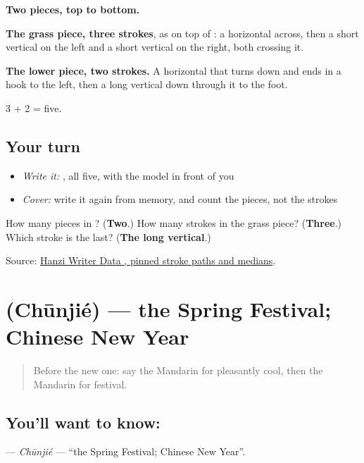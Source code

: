 \begin{quote}
\end{quote}

\textbf{Two pieces, top to bottom.}

\textbf{The grass piece, three strokes}, as on top of : a horizontal across, then a short vertical on the left and a short vertical on the right, both crossing it.

\textbf{The lower piece, two strokes.} A horizontal that turns down and ends in a hook to the left, then a long vertical down through it to the foot.

3 + 2 = five.

\subsection*{Your turn}
\begin{itemize}
\raggedright
  \item \emph{Write it:} , all five, with the model in front of you
  \item \emph{Cover:} write it again from memory, and count the pieces, not the strokes
\end{itemize}

\begin{tcolorbox}[breakable,colback=teal!4,colframe=teal!35!black,title={Before you move on}]
How many pieces in ? (\textbf{Two}.) How many strokes in the grass piece? (\textbf{Three}.) Which stroke is the last? (\textbf{The long vertical}.)

Source: \href{https://raw.githubusercontent.com/chanind/hanzi-writer-data/68d10a4b21150cae5e1ebbd223eed289cf32d90c/data/\%E8\%8A\%82.json}{Hanzi Writer Data , pinned stroke paths and medians}.
\end{tcolorbox}
\section[\texorpdfstring{\zh{春节} (Chūnjié)}{春节 (Chūnjié)}]{ (Chūnjié) — the Spring Festival; Chinese New Year}

\label{lesson:ZH-C137-chunjie}



\begin{quote}
Before the new one: say the Mandarin for pleasantly cool, then the Mandarin for festival.
\end{quote}

\subsection*{You'll want to know: }
\textbf{} — \emph{Chūnjié} — \textquotedblleft{}the Spring Festival; Chinese New Year\textquotedblright{}.

